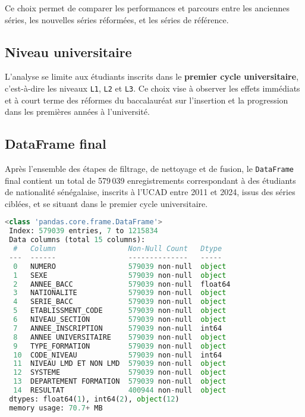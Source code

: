 Ce choix permet de comparer les performances et parcours entre les anciennes séries, les nouvelles séries réformées, et les séries de référence.

\subsection{Niveau universitaire}

L’analyse se limite aux étudiants inscrits dans le \textbf{premier cycle universitaire}, c’est-à-dire les niveaux \texttt{L1}, \texttt{L2} et \texttt{L3}. 
Ce choix vise à observer les effets immédiats et à court terme des réformes du baccalauréat sur l’insertion et la progression dans les premières années à l’université.

\subsection{DataFrame final}

Après l’ensemble des étapes de filtrage, de nettoyage et de fusion, le \texttt{DataFrame} final contient un total de 579\,039 enregistrements correspondant à des étudiants de nationalité sénégalaise, inscrits à l’UCAD entre 2011 et 2024, issus des séries ciblées, et se situant dans le premier cycle universitaire.

\begin{lstlisting}[language=Python,
    caption=Filtrage des données,
    label=lst:filtrage,
    basicstyle=\ttfamily\small,
    backgroundcolor=\color{gray!10}
]
 <class 'pandas.core.frame.DataFrame'>
 Index: 579039 entries, 7 to 1215834
 Data columns (total 15 columns):
  #   Column                 Non-Null Count   Dtype  
 ---  ------                 --------------   -----  
  0   NUMERO                 579039 non-null  object 
  1   SEXE                   579039 non-null  object 
  2   ANNEE_BACC             579039 non-null  float64
  3   NATIONALITE            579039 non-null  object 
  4   SERIE_BACC             579039 non-null  object 
  5   ETABLISSMENT_CODE      579039 non-null  object 
  6   NIVEAU_SECTION         579039 non-null  object 
  7   ANNEE_INSCRIPTION      579039 non-null  int64  
  8   ANNEE UNIVERSITAIRE    579039 non-null  object 
  9   TYPE_FORMATION         579039 non-null  object 
  10  CODE_NIVEAU            579039 non-null  int64  
  11  NIVEAU LMD ET NON LMD  579039 non-null  object 
  12  SYSTEME                579039 non-null  object 
  13  DEPARTEMENT FORMATION  579039 non-null  object 
  14  RESULTAT               400944 non-null  object 
 dtypes: float64(1), int64(2), object(12)
 memory usage: 70.7+ MB
\end{lstlisting}

